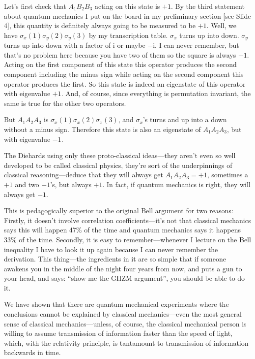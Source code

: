 \documentclass[twocolumn,prb]{revtex4}
\renewcommand{\i}{\text{i}}
\begin{document}
Let's first check that $A_1B_2B_3$ acting on this state is $+1$.
By the third statement about quantum mechanics I put on the board in my preliminary section [see Slide 4], this quantity is definitely always going to be measured to be $+1$. Well, we have $\sigma_x(1)\sigma_y(2)\sigma_y(3)$ by my transcription table. $\sigma_x$ turns up into down. $\sigma_y$ turns up into down with a factor of $\i$ or maybe $-\i$, I can never remember,
but that's no problem here because you have two of them so the square is always $-1$.  Acting on the first component of this state this operator produces the second component including the minus sign while acting on the second component this operator produces the first. So this state is indeed an eigenstate of this operator with eigenvalue $+1$. And, of course, since everything is permutation invariant, the same is true for the other two operators.

But $A_1A_2A_3$ is $\sigma_x(1)\sigma_x(2)\sigma_x(3)$, and $\sigma_x$'s turns and up into a down without a minus sign. Therefore this state is also an eigenstate of $A_1A_2A_3$, but with eigenvalue $-1$.

The Diehards using only these proto-classical ideas---they aren't even so well developed to be called classical physics, they're sort of the underpinnings of classical reasoning---deduce that they will always get $A_1A_2A_3=+1$, sometimes a $+1$ and two $-1$'s, but always $+1$. In fact, if quantum mechanics is right, they will always get $-1$.

This is pedagogically superior to the original Bell argument for two reasons: Firstly, it doesn't involve correlation coefficients---it's not that classical mechanics says this will happen 47\% of the time and quantum mechanics says it happens 33\% of the time. Secondly, it is easy to remember---whenever I lecture on the Bell inequality I have to look it up again because I can never remember the derivation. This thing---the ingredients in it are so simple that if someone awakens you in the middle of the night four years from now, and puts a gun to your head, and says: ``show me the GHZM argument'', you should be able to do it.

We have shown that there are quantum mechanical experiments where the conclusions cannot be explained by classical mechanics---even the most general sense of classical mechanics---unless, of course, the classical mechanical person is willing to assume transmission of information faster than the speed of light, which, with the relativity principle, is tantamount to transmission of information backwards in time.
\end{document}
